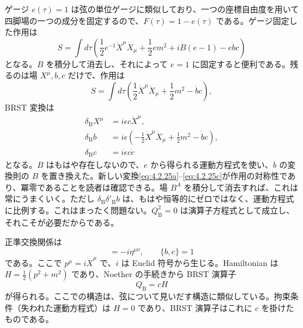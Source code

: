 ゲージ $e(\tau)=1$ は弦の単位ゲージに類似しており、一つの座標自由度を用いて四脚場の一つの成分を固定するので、$F(\tau)=1-e(\tau)$ である。ゲージ固定した作用は
\begin{equation}
S=\int d\tau\left(
\frac12e^{-1}\dot X^\mu\dot X_\mu+\frac12em^2+iB(e-1)-e\dot b c
\right)
\tag{4.2.23}\label{eq:4.2.23}
\end{equation}
となる。$B$ を積分して消去し、それによって $e=1$ に固定すると便利である。残るのは場 $X^\mu,b,c$ だけで、作用は
\begin{equation}
S=\int d\tau\left(\frac12\dot X^\mu\dot X_\mu+\frac12m^2-\dot b c\right),
\tag{4.2.24}\label{eq:4.2.24}
\end{equation}
BRST 変換は
\begin{align}
\delta_{\mathrm B}X^\mu&=i\epsilon c\dot X^\mu,
\tag{4.2.25a}\label{eq:4.2.25a}\\
\delta_{\mathrm B}b&=i\epsilon\left(-\frac12\dot X^\mu\dot X_\mu+\frac12m^2-\dot b c\right),
\tag{4.2.25b}\label{eq:4.2.25b}\\
\delta_{\mathrm B}c&=i\epsilon c\dot c
\tag{4.2.25c}\label{eq:4.2.25c}
\end{align}
となる。$B$ はもはや存在しないので、$e$ から得られる運動方程式を使い、$b$ の変換則の $B$ を置き換えた。新しい変換\eqref{eq:4.2.25a}--\eqref{eq:4.2.25c}が作用の対称性であり、冪零であることを読者は確認できる。場 $B^A$ を積分して消去すれば、これは常にうまくいく。ただし $\delta_{\mathrm B}\delta'_{\mathrm B}b$ は、もはや恒等的にゼロではなく、運動方程式に比例する。これはまったく問題ない。$Q_{\mathrm B}^2=0$ は演算子方程式として成立し、それこそが必要だからである。

正準交換関係は
\begin{equation}
[p^\mu,X^\nu]=-i\eta^{\mu\nu},\qquad\{b,c\}=1
\tag{4.2.26}\label{eq:4.2.26}
\end{equation}
である。ここで $p^\mu=i\dot X^\mu$ で、$i$ は Euclid 符号から生じる。Hamiltonian は $H=\tfrac12(p^2+m^2)$ であり、Noether の手続きから BRST 演算子
\begin{equation}
Q_{\mathrm B}=cH
\tag{4.2.27}\label{eq:4.2.27}
\end{equation}
が得られる。ここでの構造は、弦について見いだす構造に類似している。拘束条件（失われた運動方程式）は $H=0$ であり、BRST 演算子はこれに $c$ を掛けたものである。

